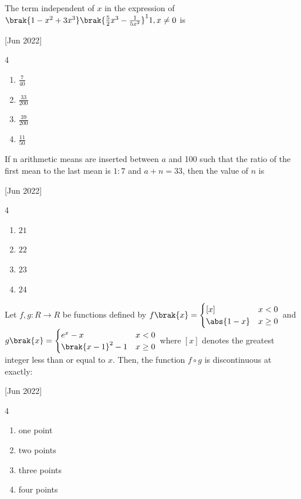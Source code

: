     \item The term independent of $x$ in the expression of $\brak{1-x^2+3x^3}\brak{\frac{5}{2}x^3-\frac{1}{5x^2}}^11,x\neq 0$ is
    
    \hfill{[Jun 2022]}

		\begin{multicols}{4}
			\begin{enumerate}
				\item $\frac{7}{40}$
				\item $\frac{33}{200}$
				\item $\frac{39}{200}$
				\item $\frac{11}{50}$
			\end{enumerate}
		\end{multicols}

    \item If n arithmetic means are inserted between $a$ and 100 such that the ratio of the first mean to the last mean is $1:7$ and $a+n=33$, then the value of $n$ is
    
    \hfill{[Jun 2022]}

		\begin{multicols}{4}
			\begin{enumerate}
				\item $21$
				\item $22$
				\item $23$
				\item $24$
			\end{enumerate}
		\end{multicols}
  
    \item Let $f,g:R\to R$ be functions defined by
        $f\brak{x}=
        \begin{cases}
        \left[x\right] & x<0\\
        \abs{1-x} & x\geq 0
        \end{cases}
        $ and 
        $g\brak{x}=
        \begin{cases}
        e^x-x & x<0\\
        \brak{x-1}^2-1 & x\geq0
        \end{cases}
        $ where $\left[x\right]$ denotes the greatest integer less than or equal to $x$. Then, the function $f\circ g$ is discontinuous at exactly:
    
    \hfill{[Jun 2022]}

        \begin{multicols}{4}
            \begin{enumerate}
                \item one point
                \item two points
                \item three points
                \item four points
            \end{enumerate}
        \end{multicols}

